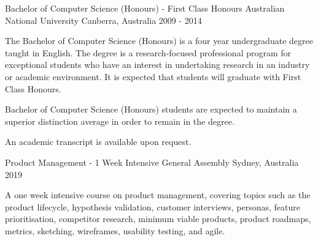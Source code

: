 


\begin{cventries}


\cventry
{Bachelor of Computer Science (Honours) - First Class Honours} %
{Australian National University} %
{Canberra, Australia} %
{2009 - 2014} %
{ %
\begin{cvitems}
\item {The Bachelor of Computer Science (Honours) is a four year undergraduate degree taught in English. The degree is a research-focused professional program for exceptional students who have an interest in undertaking research in an industry or academic environment. It is expected that students will graduate with First Class Honours.}
\item {Bachelor of Computer Science (Honours) students are expected to maintain a superior distinction average in order to remain in the degree.}
\item {An academic transcript is available upon request.}
\end{cvitems}
}

\cventry
{Product Management - 1 Week Intensive} %
{General Assembly} %
{Sydney, Australia} %
{2019} %
{ %
\begin{cvitems}
\item {
  A one week intensive course on product management, covering topics such as the product lifecycle, hypothesis validation, customer interviews, personas, feature prioritisation, competitor research, minimum viable products, product roadmaps, metrics, sketching, wireframes, usability testing, and agile.
}
\end{cvitems}
}


\end{cventries}